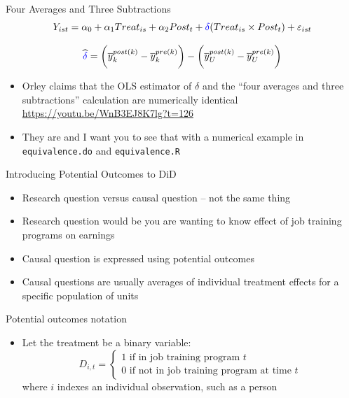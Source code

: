 \documentclass{beamer}
\begin{document}
\begin{frame}{Four Averages and Three Subtractions}
$$Y_{ist} = \alpha_0 + \alpha_1 Treat_{is} + \alpha_2 Post_{t} + \textcolor{blue}{\delta} (Treat_{is} \times Post_t) + \varepsilon_{ist} $$

\bigskip

$$\widehat{\textcolor{blue}{\delta}} = \bigg ( \overline{y}_k^{post(k)} - \overline{y}_k^{pre(k)} \bigg ) - \bigg ( \overline{y}_U^{post(k)} - \overline{y}_U^{pre(k)} \bigg ) $$

\begin{itemize}
\item Orley claims that the OLS estimator of $\delta$ and the ``four averages and three subtractions'' calculation are numerically identical \\ \url{https://youtu.be/WnB3EJ8K7lg?t=126}
\item They are and I want you to see that with a numerical example in \texttt{equivalence.do} and \texttt{equivalence.R}
\end{itemize}

\end{frame}

\begin{frame}{Introducing Potential Outcomes to DiD}

\begin{itemize}
\item Research question versus causal question -- not the same thing
\item Research question would be you are wanting to know effect of job training programs on earnings
\item Causal question is expressed using potential outcomes
\item Causal questions are usually averages of individual treatment effects for a specific population of units
\end{itemize}

\end{frame}




\begin{frame}{Potential outcomes notation}
	
	\begin{itemize}
	\item Let the treatment be a binary variable: $$D_{i,t} =\begin{cases} 1 \text{ if in job training program $t$} \\ 0 \text{ if not in job training program at time $t$} \end{cases}$$where $i$ indexes an individual observation, such as a person

	\end{itemize}
\end{frame}
\end{document}
